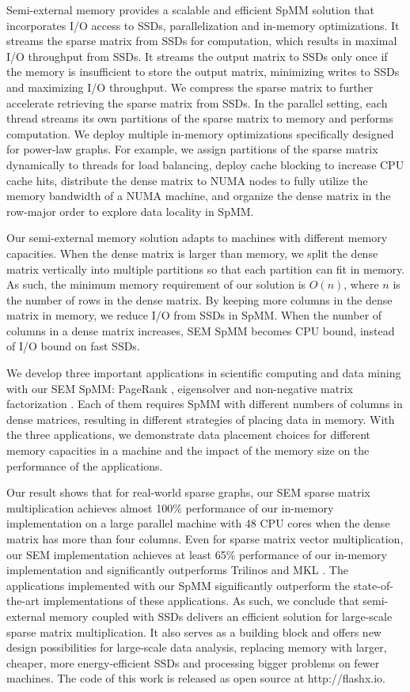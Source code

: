 Semi-external memory provides a scalable and efficient SpMM solution that
incorporates I/O access to SSDs, parallelization and in-memory optimizations.
It streams the sparse matrix from SSDs for computation, which results in maximal
I/O throughput from SSDs. It streams the output matrix to SSDs only once if
the memory is insufficient to store the output matrix, minimizing writes to
SSDs and maximizing I/O throughput.
We compress the sparse matrix to further accelerate retrieving the sparse
matrix from SSDs. In the parallel setting, each thread streams its own partitions
of the sparse matrix to memory and performs computation.
We deploy multiple in-memory optimizations specifically designed for power-law
graphs. For example, we assign partitions of the sparse matrix dynamically to
threads for load balancing, deploy cache blocking to increase CPU cache hits,
distribute the dense matrix to NUMA nodes to fully utilize the memory
bandwidth of a NUMA machine, and organize the dense matrix in the row-major order
to explore data locality in SpMM.

Our semi-external memory solution adapts to machines with different memory
capacities. When the dense matrix is larger than memory, we split the dense
matrix vertically into multiple partitions so that each partition can fit in
memory. As such, the minimum memory requirement of our solution is $O(n)$,
where $n$ is the number of rows in the dense matrix. By keeping more columns
in the dense matrix in memory, we reduce I/O from SSDs in SpMM. When the number
of columns in a dense matrix increases, SEM SpMM becomes CPU bound, instead of
I/O bound on fast SSDs.

We develop three important applications in scientific computing and data mining
with our SEM SpMM: PageRank \cite{pagerank}, eigensolver \cite{anasazi} and
non-negative matrix factorization \cite{nmf}. Each of them requires SpMM with
different numbers of columns in dense matrices, resulting in different
strategies of placing data in memory. With the three applications, we
demonstrate data placement choices for different memory capacities in a machine
and the impact of the memory size on the performance of the applications.


Our result shows that for real-world sparse graphs, our SEM sparse matrix
multiplication achieves almost 100\% performance of our in-memory implementation
on a large parallel machine with 48 CPU cores
when the dense matrix has more than four columns. Even for sparse matrix vector
multiplication, our SEM implementation achieves at least 65\% performance of
our in-memory implementation and significantly outperforms Trilinos \cite{trilinos}
and MKL \cite{mkl}. The applications implemented with our SpMM significantly
outperform the state-of-the-art implementations of these applications. As such,
we conclude that semi-external memory coupled with SSDs delivers an efficient
solution for large-scale sparse matrix multiplication. It also serves
as a building block and offers new design possibilities for large-scale
data analysis, replacing memory with larger, cheaper, more energy-efficient SSDs
and processing bigger problems on fewer machines. The code of this work is
released as open source at http://flashx.io.
